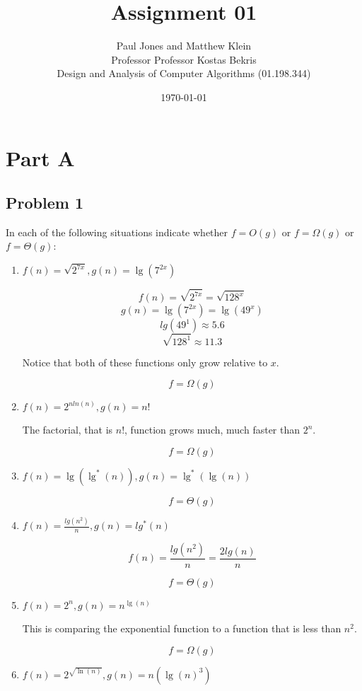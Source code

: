\documentclass[11pt]{article}
\title{Assignment 01}
\author{Paul Jones and Matthew Klein \\
		Professor Professor Kostas Bekris\\
		Design and Analysis of Computer Algorithms (01.198.344)}
\date{\today}
\begin{document}
\maketitle

\pagebreak

\section*{Part A}

\subsection*{Problem 1}

In each of the following situations indicate whether $f = O(g)$ or $f = \Omega(g)$ 
or $f = \Theta(g)$:

\begin{enumerate}

\item $f(n) = \sqrt{2^{7x}}, g(n) = \lg(7^{2x})$

\[ f(n) = \sqrt{2^{7x}} = \sqrt{128^{x}}\]
\[ g(n) = \lg(7^{2x}) = \lg(49^{x})\]
\[ lg(49^1) \approx 5.6 \]
\[ \sqrt{128^{1}} \approx 11.3 \]

Notice that both of these functions only grow relative to $x$.

\[ f = \Omega(g) \]

\item $f(n) = 2^{nln(n)}, g(n) = n!$

The factorial, that is $n!$, function grows much, much faster than $2^n$.

\[ f = \Omega(g) \]

\item $f(n) = \lg(\lg^*(n)), g(n) = \lg^*(\lg(n)) $

\[ f = \Theta(g) \]

\item $f(n) = \frac{lg(n^2)}{n}, g(n) = lg^*(n)$

\[f(n) = \frac{lg(n^2)}{n} = \frac{2 lg(n)}{n}\]

\[ f = \Theta(g) \]

\item $f(n) = 2^n, g(n) = n^{\lg(n)}$

This is comparing the exponential function to a function that is less than
$n^2$.

\[ f = \Omega(g) \]

\item $f(n) = 2^{\sqrt{\ln(n)}}, g(n) = n(\lg(n)^3)$


\end{enumerate}
\end{document}
